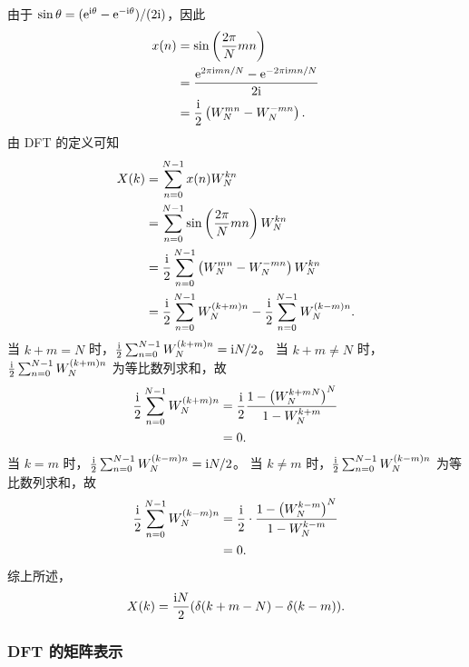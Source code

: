 \begin{solution}
    由于 $\sin\theta = (\mathrm{e}^{\mathrm{i}\theta} - \mathrm{e}^{-\mathrm{i}\theta})/(2\mathrm{i})$，因此
    \begin{align*}
        x(n) & = \sin\left(\frac{2\pi}{N}mn\right) \\
        & = \frac{\mathrm{e}^{2\pi\mathrm{i} mn/N} - \mathrm{e}^{-2\pi\mathrm{i} mn/N}}{2\mathrm{i}} \\
        & = \frac{\mathrm{i}}{2} \left(W_N^{mn} - W_N^{-mn}\right).
    \end{align*}
    由 DFT 的定义可知
    \begin{align*}
        X(k) & = \sum_{n = 0}^{N - 1} x(n)W_N^{kn} \\
        & = \sum_{n = 0}^{N - 1} \sin\left(\frac{2\pi}{N}mn\right)W_N^{kn} \\
        & = \frac{\mathrm{i}}{2}\sum_{n = 0}^{N - 1}\left(W_N^{mn} - W_N^{-mn}\right)W_N^{kn} \\
        & = \frac{\mathrm{i}}{2}\sum_{n = 0}^{N - 1}W_N^{(k + m)n} - \frac{\mathrm{i}}{2}\sum_{n = 0}^{N - 1}W_N^{(k - m)n}.
    \end{align*}
    当 $k + m = N$ 时，$\frac{\mathrm{i}}{2}\sum_{n = 0}^{N - 1}W_N^{(k + m)n} = \mathrm{i} N / 2$。
    当 $k + m \neq N$ 时，$\frac{\mathrm{i}}{2}\sum_{n = 0}^{N - 1}W_N^{(k + m)n}$ 为等比数列求和，故
    \begin{align*}
        \frac{\mathrm{i}}{2}\sum_{n = 0}^{N - 1}W_N^{(k + m)n} & = \frac{\mathrm{i}}{2}\frac{1 - \left(W_N^{k + mN}\right)^N}{1 - W_N^{k + m}} \\
        & = 0.
    \end{align*}
    当 $k = m$ 时，$\frac{\mathrm{i}}{2}\sum_{n = 0}^{N - 1}W_N^{(k - m)n} = \mathrm{i} N / 2$。
    当 $k \ne m$ 时，$\frac{\mathrm{i}}{2}\sum_{n = 0}^{N - 1}W_N^{(k - m)n}$ 为等比数列求和，故
    \begin{align*}
        \frac{\mathrm{i}}{2}\sum_{n = 0}^{N - 1}W_N^{(k - m)n} & = \frac{\mathrm{i}}{2} \cdot \frac{1 - \left(W_N^{k - m}\right)^N}{1 - W_N^{k - m}} \\
        & = 0.
    \end{align*}
    综上所述，
    \begin{align*}
        X(k) = \frac{\mathrm{i} N}{2}(\delta(k + m - N) - \delta(k - m)).
    \end{align*}
\end{solution}

\subsubsection{DFT 的矩阵表示}

